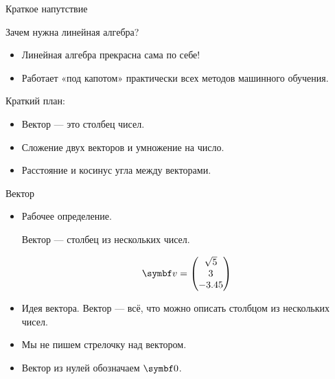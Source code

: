 
\begin{frame} %


\end{frame}




\begin{frame}{Краткое напутствие}

    Зачем нужна \alert{линейная алгебра}?

\begin{itemize}[<+->]
  \item Линейная алгебра прекрасна сама по себе!
  \item Работает «под капотом» практически всех методов машинного обучения.
\end{itemize}

\end{frame}



\begin{frame}{Краткий план:}
  \begin{itemize}[<+->]
    \item Вектор — это столбец чисел.
    \item Сложение двух векторов и умножение на число.
    \item Расстояние и косинус угла между векторами.
  \end{itemize}

\end{frame}


\begin{frame}{Вектор}


\begin{itemize}[<+->]
\item Рабочее определение. 

\alert{Вектор} — столбец из нескольких чисел.   

\[
\bv = \begin{pmatrix}
  \sqrt{5} \\
  3 \\
  -3.45
\end{pmatrix}
\]

\item Идея вектора. Вектор — всё, что можно описать столбцом из нескольких чисел. 

\item Мы не пишем стрелочку над вектором.

\item Вектор из нулей обозначаем $\bzero$.

\end{itemize}

\end{frame}



